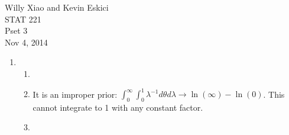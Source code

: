 \documentclass[paper=a4, fontsize=11pt]{scrartcl}
\begin{document}
\noindent Willy Xiao and Kevin Eskici \\ STAT 221 \\Pset 3\\ Nov 4, 2014
\begin{enumerate}
  \item
    \begin{enumerate}[1]
      \item 
      \item It is an improper prior: $\int_0^\infty{\int_0^1{\lambda^{-1}}}d\theta d\lambda \rightarrow \ln(\infty) - \ln(0)$. This cannot integrate to 1 with any constant factor.
	
	\item      
      
    \end{enumerate}
\end{enumerate}
\end{document}
